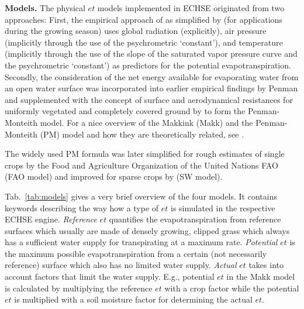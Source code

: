 \documentclass{scrreprt}
\begin{document}
\textbf{Models.}
The physical $et$ models implemented in ECHSE originated from two approaches:
First, the empirical approach of \citet{makkink57} as simplified by \citet{debruin87} (for applications during the growing season) uses global radiation (explicitly), air pressure (implicitly through the use of the psychrometric `constant'), and temperature (implicitly through the use of the slope of the saturated vapor pressure curve and the psychrometric `constant') as predictors for the potential evapotranspiration.
Secondly, the consideration of the net energy available for evaporating water from an open water surface was incorporated into earlier empirical findings by Penman and supplemented with the concept of surface and aerodynamical resistances for uniformly vegetated and completely covered ground by \citet{monteith65} to form the Penman-Monteith model.
For a nice overview of the Makkink (Makk) and the Penman-Monteith (PM) model and how they are theoretically related, see \citet{debruin87}.

The widely used PM formula was later simplified for rough estimates of single crops by the Food and Agriculture Organization of the United Nations FAO \citep{fao98} (FAO model) and improved for sparse crops by \citet{shuttleworth85} (SW model).

Tab.~\ref{tab:models} gives a very brief overview of the four models.
It contains keywords describing the way how a type of $et$ is simulated in the respective ECHSE engine.
\emph{Reference} $et$ quantifies the evapotranspiration from reference surfaces which usually are made of densely growing, clipped grass which always has a sufficient water supply for transpirating at a maximum rate.
\emph{Potential} $et$ is the maximum possible evapotranspiration from a certain (not necessarily reference) surface which also has no limited water supply.
\emph{Actual} $et$ takes into account factors that limit the water supply.
E.g., potential $et$ in the Makk model is calculated by multiplying the reference $et$ with a crop factor while the potential $et$ is multiplied with a soil moisture factor for determining the actual $et$.
\end{document}
